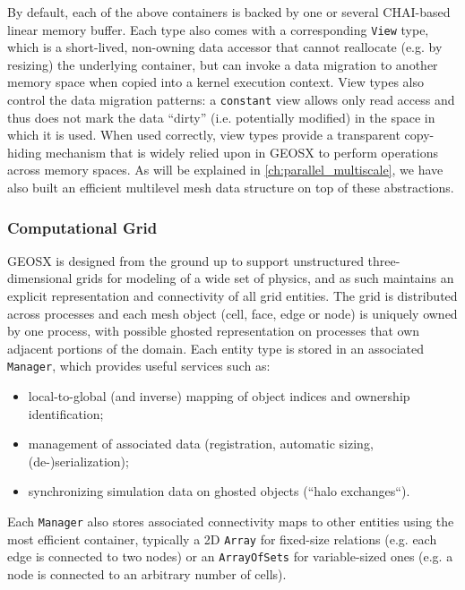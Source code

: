 By default, each of the above containers is backed by one or several CHAI-based linear memory buffer.   Each type also comes with a corresponding \texttt{View} type, which is a short-lived, non-owning data accessor that cannot reallocate (e.g. by resizing) the underlying container, but can invoke a data migration to another memory space when copied into a kernel execution context.   View types also control the data migration patterns: a \texttt{constant} view allows only read access and thus does not mark the data ``dirty'' (i.e. potentially modified) in the space in which it is used.   When used correctly, view types provide a transparent copy-hiding mechanism that is widely relied upon in GEOSX to perform operations across memory spaces.   As will be explained in \cref{ch:parallel_multiscale}, we have also built an efficient multilevel mesh data structure on top of these abstractions.

\subsubsection{Computational Grid}

GEOSX is designed from the ground up to support unstructured three-dimensional grids for modeling of a wide set of physics, and as such maintains an explicit representation and connectivity of all grid entities.   The grid is distributed across processes and each mesh object (cell, face, edge or node) is uniquely owned by one process, with possible ghosted representation on processes that own adjacent portions of the domain.   Each entity type is stored in an associated \texttt{Manager}, which provides useful services such as:
\begin{itemize}
    \item local-to-global (and inverse) mapping of object indices and ownership identification;
    \item management of associated data (registration, automatic sizing, (de-)serialization);
    \item synchronizing simulation data on ghosted objects (``halo exchanges``).
\end{itemize}
Each \texttt{Manager} also stores associated connectivity maps to other entities using the most efficient container, typically a 2D \texttt{Array} for fixed-size relations (e.g. each edge is connected to two nodes) or an \texttt{ArrayOfSets} for variable-sized ones (e.g. a node is connected to an arbitrary number of cells). 

